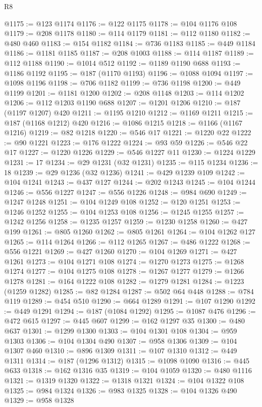 \begin{lexlean}{R8}
\begin{coremodule}
@1175 := @123 @1174
@1176 := @122 @1175
@1178 := @104 @1176 @108
@1179 := @208 @1178
@1180 := @114 @1179
@1181 := @112 @1180
@1182 := @480 @460
@1183 := @154 @1182
@1184 := @736 @1183
@1185 := @449 @1184
@1186 := @1181 @1185
@1187 := @208 @1003
@1188 := @114 @1187
@1189 := @112 @1188
@1190 := @1014 @512
@1192 := @1189 @1190 @688
@1193 := @1186 @1192
@1195 := @187 (@1170 @1193)
@1196 := @1088 @1094
@1197 := @1098 @1196
@1198 := @706 @1182
@1199 := @736 @1198
@1200 := @449 @1199
@1201 := @1181 @1200
@1202 := @208 @1148
@1203 := @114 @1202
@1206 := @112 @1203 @1190 @688
@1207 := @1201 @1206
@1210 := @187 (@1197 @1207) @420
@1211 := @1195 @1210
@1212 := @1169 @1211
@1215 := @187 (@1168 @1212) @420
@1216 := @1086 @1215
@1218 := @1166 (@1167 @1216)
@1219 := @82 @1218
@1220 := @546 @17
@1221 := @1220 @22
@1222 := @90 @1221
@1223 := @176 @1222
@1224 := @93 @59
@1226 := @546 @22 @17
@1227 := @1220 @1226
@1229 := @546 @1227 @11
@1230 := @1224 @1229
@1231 := 17
@1234 := @29 @1231 (@32 @1231)
@1235 := @115 @1234
@1236 := 18
@1239 := @29 @1236 (@32 @1236)
@1241 := @429 @1239 @109
@1242 := @104 @1241
@1243 := @437 @127
@1244 := @202 @1243
@1245 := @104 @1244
@1246 := @556 @1227
@1247 := @556 @1226
@1248 := @984 @690
@1249 := @1247 @1248
@1251 := @104 @1249 @108
@1252 := @120 @1251
@1253 := @1246 @1252
@1255 := @104 @1253 @108
@1256 := @1245 @1255
@1257 := @1242 @1256
@1258 := @1235 @1257
@1259 := @1230 @1258
@1260 := @427 @199
@1261 := @805 @1260
@1262 := @805 @1261
@1264 := @104 @1262 @127
@1265 := @114 @1264
@1266 := @112 @1265
@1267 := @486 @1222
@1268 := @556 @1221
@1269 := @427 @1260
@1270 := @104 @1269
@1271 := @427 @1261
@1273 := @104 @1271 @108
@1274 := @1270 @1273
@1275 := @1268 @1274
@1277 := @104 @1275 @108
@1278 := @1267 @1277
@1279 := @1266 @1278
@1281 := @164 @1222 @108
@1282 := @1279 @1281
@1284 := @1223 (@1259 @1282)
@1285 := @82 @1284
@1287 := @502 @64 @448
@1288 := @784 @119
@1289 := @454 @510
@1290 := @664 @1289
@1291 := @107 @1290
@1292 := @449 @1291
@1294 := @187 (@1084 @1292)
@1295 := @1087 @476
@1296 := @472 @615
@1297 := @445 @607
@1299 := @162 @1297 @35
@1300 := @480 @637
@1301 := @1299 @1300
@1303 := @104 @1301 @108
@1304 := @959 @1303
@1306 := @104 @1304 @490
@1307 := @958 @1306
@1309 := @104 @1307 @460
@1310 := @896 @1309
@1311 := @107 @1310
@1312 := @449 @1311
@1314 := @187 (@1296 @1312)
@1315 := @1098 @1090
@1316 := @445 @633
@1318 := @162 @1316 @35
@1319 := @104 @1059
@1320 := @480 @1116
@1321 := @1319 @1320
@1322 := @1318 @1321
@1324 := @104 @1322 @108
@1325 := @984 @1324
@1326 := @983 @1325
@1328 := @104 @1326 @490
@1329 := @958 @1328

\end{coremodule}
\end{lexlean}

